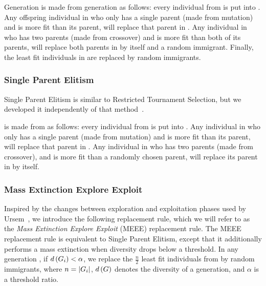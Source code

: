 Generation  is made from generation  as follows: every individual from  is put into . Any offspring individual in  who only has a single parent (made from mutation) and is more fit than its parent, will replace that parent in . Any individual in  who has two parents (made from crossover) and is more fit than both of its parents, will replace both parents in  by itself and a random immigrant. Finally, the  least fit individuals in  are replaced by random immigrants.

\subsubsection{Single Parent Elitism}
Single Parent Elitism is similar to Restricted Tournament Selection, but we developed it independently of that method~\cite[p.\ 132]{Luke2013Metaheuristics}.

 is made from  as follows: every individual from  is put into . Any individual in  who only has a single parent (made from mutation) and is more fit than its parent, will replace that parent in . Any individual in  who has two parents (made from crossover), and is more fit than a randomly chosen parent, will replace its parent in  by itself.

\subsubsection{Mass Extinction Explore Exploit}
Inspired by the changes between exploration and exploitation phases used by Ursem~\cite{ursem2002diversity}, we introduce the following replacement rule, which we will refer to as the \emph{Mass Extinction Explore Exploit} (MEEE) replacement rule. The MEEE replacement rule is equivalent to Single Parent Elitism, except that it additionally performs a mass extinction when diversity drops below a threshold. In any generation , if $d\left(G_{i}\right) < \alpha$, we replace the $\tfrac{n}{2}$ least fit individuals from  by random immigrants, where $n = \lvert G_{i}\rvert$, $d\left(G\right)$ denotes the diversity of a generation, and $\alpha$ is a threshold ratio.

